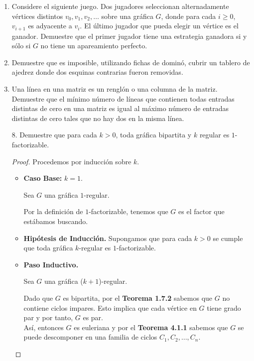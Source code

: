 \documentclass{article}
\begin{document}
\begin{enumerate}
  \item Considere el siguiente juego.   Dos jugadores seleccionan alternadamente
  v\'ertices distintos $v_0, v_1, v_2, \dots$ sobre una gr\'afica $G$, donde
  para cada $i \ge 0$, $v_{i+1}$ es adyacente a $v_i$.   El \'ultimo jugador
  que pueda elegir un v\'ertice es el ganador. Demuestre que el primer jugador
  tiene una estrategia ganadora si y s\'olo si $G$ no tiene un apareamiento
  perfecto.

  \item Demuestre que es imposible, utilizando fichas de domin\'o, cubrir un
  tablero de ajedrez donde dos esquinas contrarias fueron removidas.

  \item Una l\'inea en una matriz es un rengl\'on o una columna de la matriz.
  Demuestre que el m\'inimo n\'umero de l\'ineas que contienen todas entradas
  distintas de cero en una matriz es igual al m\'aximo n\'umero de entradas
  distintas de cero tales que no hay dos en la misma l\'inea.

  \item[8.] Demuestre que para cada $k > 0$, toda gr\'afica bipartita y $k$ regular
  es $1$-factorizable.

    \begin{proof}
      Procedemos por inducción sobre $k$.

      \begin{itemize}
        \item \textbf{Caso Base:} $k = 1$.

          Sea $G$ una gráfica $1$-regular.

          Por la definición de $1$-factorizable, tenemos que $G$ es el factor que estábamos buscando.

        \item \textbf{Hipótesis de Inducción.} Supongamos que para cada $k > 0$ se cumple que toda gráfica $k$-regular es $1$-factorizable.

        \item \textbf{Paso Inductivo.}

          Sea $G$ una gráfica ($k + 1$)-regular.

          Dado que $G$ es bipartita, por el \textbf{Teorema 1.7.2} sabemos que $G$ no contiene ciclos impares. Esto implica que cada vértice en $G$ tiene grado par y por tanto, $G$ es par. \\
          Así, entonces $G$ es euleriana y por el \textbf{Teorema 4.1.1} sabemos que $G$ se puede descomponer en una familia de ciclos $C_{1}, C_{2}, \dots, C_{n}$.


\end{itemize}
\end{proof}
\end{enumerate}
\end{document}
